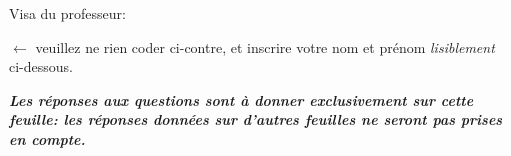 \documentclass[a4paper]{article}
\begin{document}
{\vspace*{2cm}Visa du professeur: \dotfill
\newpage




\vspace{1ex}





\hspace*{\fill}
\begin{minipage}[b]{6.5cm}
\setlength{\parindent}{0pt}
$\longleftarrow{}$\hspace{0pt plus 1cm} veuillez ne rien coder ci-contre,
et inscrire votre nom et prénom \textit{lisiblement} ci-dessous.

\vspace{3ex}

  \hfill\vspace{5ex}
  \end{minipage}

  \vspace{1ex}
{\bf\em\setlength{\parindent}{0pt} Les réponses aux questions sont à donner \textit{exclusivement} sur cette feuille: les réponses données sur d'autres feuilles ne seront \textit{pas prises en compte}.


}}
\end{document}
